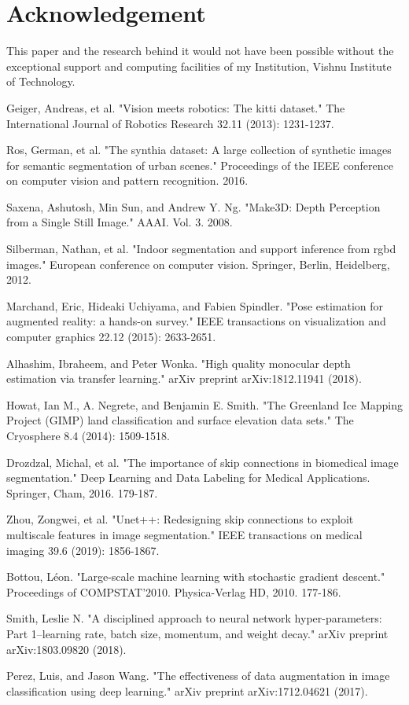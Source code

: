 \documentclass{article}
\begin{document}
\section{Acknowledgement}
This paper and the research behind it would not have been possible without the exceptional support and computing facilities of my Institution, Vishnu Institute of Technology.
\begin{thebibliography}{10}
 Geiger, Andreas, et al. "Vision meets robotics: The kitti dataset." The International Journal of Robotics Research 32.11 (2013): 1231-1237.

 Ros, German, et al. "The synthia dataset: A large collection of synthetic images for semantic segmentation of urban scenes." Proceedings of the IEEE conference on computer vision and pattern recognition. 2016.

 Saxena, Ashutosh, Min Sun, and Andrew Y. Ng. "Make3D: Depth Perception from a Single Still Image." AAAI. Vol. 3. 2008.

 Silberman, Nathan, et al. "Indoor segmentation and support inference from rgbd images." European conference on computer vision. Springer, Berlin, Heidelberg, 2012.

 Marchand, Eric, Hideaki Uchiyama, and Fabien Spindler. "Pose estimation for augmented reality: a hands-on survey." IEEE transactions on visualization and computer graphics 22.12 (2015): 2633-2651.

 Alhashim, Ibraheem, and Peter Wonka. "High quality monocular depth estimation via transfer learning." arXiv preprint arXiv:1812.11941 (2018).

 Howat, Ian M., A. Negrete, and Benjamin E. Smith. "The Greenland Ice Mapping Project (GIMP) land classification and surface elevation data sets." The Cryosphere 8.4 (2014): 1509-1518.

 Drozdzal, Michal, et al. "The importance of skip connections in biomedical image segmentation." Deep Learning and Data Labeling for Medical Applications. Springer, Cham, 2016. 179-187.

 Zhou, Zongwei, et al. "Unet++: Redesigning skip connections to exploit multiscale features in image segmentation." IEEE transactions on medical imaging 39.6 (2019): 1856-1867.

 Bottou, Léon. "Large-scale machine learning with stochastic gradient descent." Proceedings of COMPSTAT'2010. Physica-Verlag HD, 2010. 177-186.

 Smith, Leslie N. "A disciplined approach to neural network hyper-parameters: Part 1--learning rate, batch size, momentum, and weight decay." arXiv preprint arXiv:1803.09820 (2018).

 Perez, Luis, and Jason Wang. "The effectiveness of data augmentation in image classification using deep learning." arXiv preprint arXiv:1712.04621 (2017).

\end{thebibliography}
\end{document}
